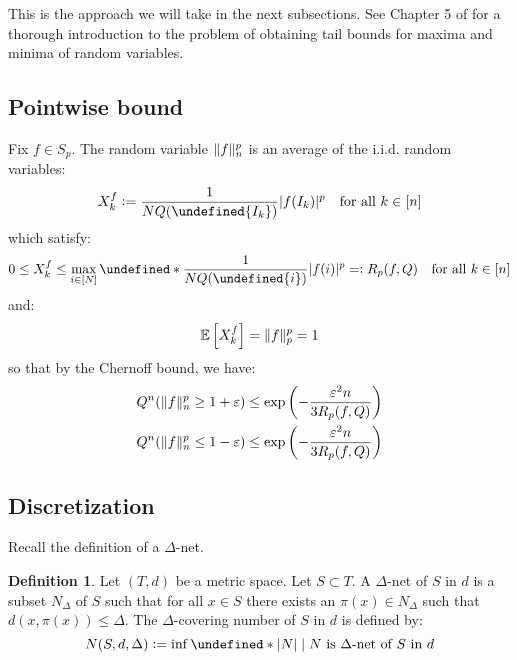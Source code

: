 \documentclass{article}
\makeatletter
\theoremstyle{plain}
\theoremstyle{definition}
\newtheorem{definition}[lemma]{Definition}
\theoremstyle{remark}
\newcommand{\defeq}{\vcentcolon=}
\newcommand{\eqdef}{=\vcentcolon}
\let\brace\undefined
\DeclarePairedDelimiter{\brace}{\lbrace}{\rbrace}
\DeclarePairedDelimiter{\paren}{\lparen}{\rparen}
\newcommand{\eps}{\varepsilon}
\DeclarePairedDelimiter{\abs}{\lvert}{\rvert}
\DeclarePairedDelimiter{\norm}{\lVert}{\rVert}
\newcommand{\E}[1]{\mathbb{E}\left[#1\right]}
\newcommand{\iid}{i.i.d.\@\xspace}
\makeatother
\begin{document}
This is the approach we will take in the next subsections. See Chapter 5 of \cite{van2014probability} for a thorough introduction to the problem of obtaining tail bounds for maxima and minima of random variables.

\subsection{Pointwise bound}
Fix $f \in S_p$. The random variable $\norm{f}_n^p$ is an average of the \iid random variables:
\begin{equation*}
    X^f_k \defeq \frac{1}{NQ(\brace{I_k})} \abs{f(I_k)}^p \quad \text{for all } k \in [n]
\end{equation*}
which satisfy:
\begin{equation*}
    0 \leq X^f_k \leq \max_{i \in [N]} \brace*{\frac{1}{NQ(\brace{i})} \abs{f(i)}^p} \eqdef R_p(f, Q) \quad \text{for all } k \in [n]
\end{equation*}
and:
\begin{equation*}
    \E{X^f_k} = \norm{f}_p^p = 1
\end{equation*}
so that by the Chernoff bound, we have:
\begin{align}
    Q^{n}\paren*{\norm{f}_n^p \geq 1+\eps} &\leq \exp{\paren*{-\frac{\eps^2 n}{3 R_p(f, Q)}}} \label{bd:1} \\
    Q^{n}\paren*{\norm{f}_n^p \leq 1-\eps} &\leq \exp{\paren*{-\frac{\eps^2 n}{3 R_p(f, Q)}}} \label{bd:2}
\end{align}

\subsection{Discretization}
Recall the definition of a $\Delta$-net.
\begin{definition}
    Let $(T, d)$ be a metric space. Let $S \subset T$. A $\Delta$-net of $S$ in $d$ is a subset $N_{\Delta}$ of $S$ such that for all $x \in S$ there exists an $\pi(x) \in N_{\Delta}$ such that $d(x , \pi(x)) \leq \Delta$. The $\Delta$-covering number of $S$ in $d$ is defined by:
    \begin{equation*}
        N(S, d, \Delta) \defeq \inf\brace*{\abs{N} \mid N \text{ is $\Delta$-net of $S$ in $d$}}
    \end{equation*}
\end{definition}
\end{document}
